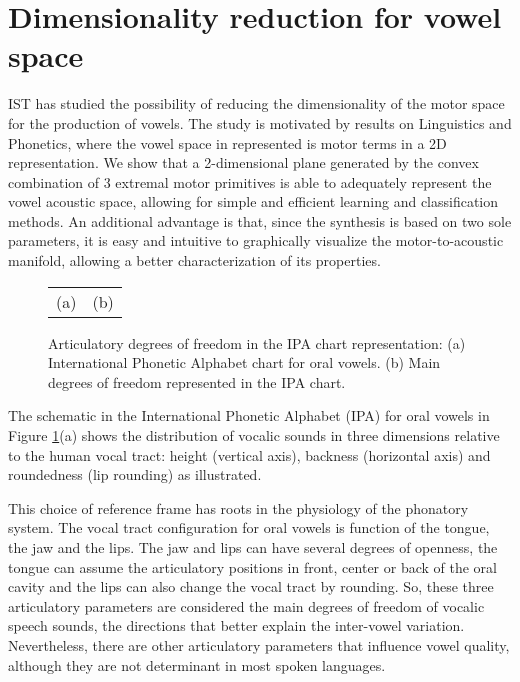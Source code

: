 \section{Dimensionality reduction for vowel space}
IST has studied the possibility of reducing the dimensionality of the
motor space for the production of vowels. The study is motivated by results on Linguistics and
Phonetics, where the vowel space in represented is motor terms in a 2D
representation. We show that a 2-dimensional plane generated by the
convex combination of 3 extremal motor primitives is able to
adequately represent the vowel acoustic space, allowing for simple and
efficient learning and classification methods. An additional advantage
is that, since the synthesis is based on two sole parameters, it is
easy and intuitive to graphically visualize the motor-to-acoustic
manifold, allowing a better characterization of its properties. 

\begin{figure}[!h]
  \centering
\begin{tabular}{cc}
(a) & (b) \\
\end{tabular}
\caption{Articulatory degrees of freedom in the IPA chart
  representation: (a) International Phonetic Alphabet chart for oral
  vowels. (b) Main degrees of freedom represented in the IPA chart.}
\label{fig:ipavowels}
\end{figure}

The schematic in the International Phonetic Alphabet (IPA) for oral
vowels in Figure \ref{fig:ipavowels}(a) shows the distribution of
vocalic sounds in three dimensions relative to the human vocal tract:
height (vertical axis), backness (horizontal axis) and roundedness
(lip rounding) \cite{IPA} as illustrated.
 
This choice of reference frame has roots in the physiology of the
phonatory system. The vocal tract configuration for oral vowels is
function of the tongue, the jaw and the lips. The jaw and lips can
have several degrees of openness, the tongue can assume the
articulatory positions in front, center or back of the oral cavity and
the lips can also change the vocal tract by rounding. So, these three
articulatory parameters are considered the main degrees of freedom of
vocalic speech sounds, the directions that better explain the
inter-vowel variation. Nevertheless, there are other articulatory
parameters that influence vowel quality, although they are not
determinant in most spoken languages.

